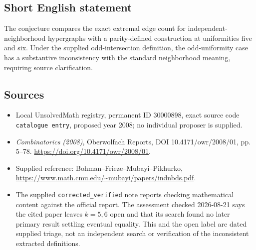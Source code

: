 \documentclass[11pt]{article}
\begin{document}
\subsection{Short English statement}
The conjecture compares the exact extremal edge count for independent-neighborhood hypergraphs with a parity-defined construction at uniformities five and six. Under the supplied odd-intersection definition, the odd-uniformity case has a substantive inconsistency with the standard neighborhood meaning, requiring source clarification.
\subsection{Sources}
\begin{itemize}
\item Local UnsolvedMath registry, permanent ID \(30000898\), exact source code \texttt{catalogue entry}, proposed year 2008; no individual proposer is supplied.
\item \emph{Combinatorics (2008)}, Oberwolfach Reports, DOI 10.4171/owr/2008/01, pp. 5--78. \url{https://doi.org/10.4171/owr/2008/01}.
\item Supplied reference: Bohman--Frieze--Mubayi--Pikhurko, \url{https://www.math.cmu.edu/~mubayi/papers/indnbds.pdf}.
\item The supplied \texttt{corrected\_verified} note reports checking mathematical content against the official report. The assessment checked 2026-08-21 says the cited paper leaves \(k=5,6\) open and that its search found no later primary result settling eventual equality. This and the open label are dated supplied triage, not an independent search or verification of the inconsistent extracted definitions.
\end{itemize}
\end{document}
